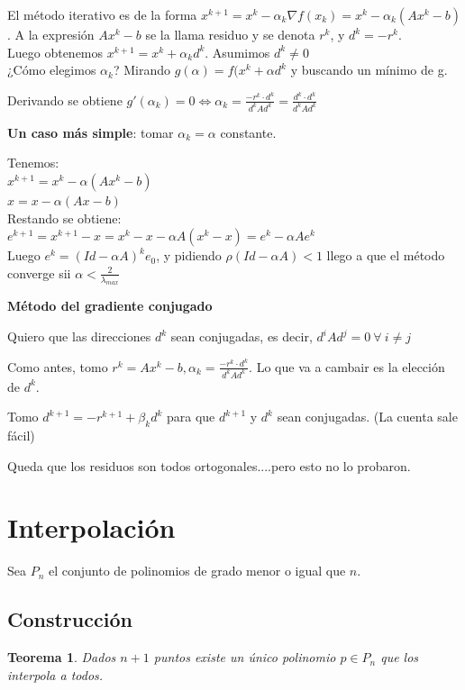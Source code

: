 \documentclass[10pt,a4paper,final]{report}
\newtheorem{theorem}{Teorema}
\begin{document}
{El método iterativo es de la forma $x^{k+1} = x^k - \alpha_k \nabla f(x_k) = x^k - \alpha_k(Ax^k-b)$. A la expresión $Ax^k-b$ se la llama residuo y se denota $r^k$, y $d^k = -r^k$. \\

Luego obtenemos $x^{k+1} = x^k + \alpha_k d^k$. Asumimos $d^k\neq0$\\

¿Cómo elegimos $\alpha_k$? Mirando $g(\alpha)=f(x^k + \alpha d^k$ y buscando un mínimo de g.

Derivando se obtiene $g'(\alpha_k) = 0 \Leftrightarrow \alpha_k = \frac{-r^k \cdot d^k}{d^k A d^k} = \frac{d^k \cdot d^k}{d^k A d^k}$

\textbf{Un caso más simple}: tomar $\alpha_k = \alpha$ constante.

Tenemos:\\

$x^{k+1}=x^k - \alpha(Ax^k-b)$\\
$x=x - \alpha(Ax-b)$\\

Restando se obtiene:\\

$e^{k+1} = x^{k+1} - x = x^k - x - \alpha A (x^k-x) = e^k - \alpha A e^k$ \\

Luego $e^k = (Id - \alpha A)^k e_0$, y pidiendo $\rho(Id-\alpha A)<1$ llego a que el método converge sii $\alpha < \frac{2}{\lambda_{max}}$


\textbf{Método del gradiente conjugado}

Quiero que las direcciones $d^k$ sean conjugadas, es decir, $d^i A d^j = 0\ \forall\ i\neq j$

Como antes, tomo $r^k = A x^k-b, \alpha_k = \frac{-r^k \cdot d^k}{d^k A d^k}$. Lo que va a cambair es la elección de $d^k$.

Tomo $d^{k+1} = - r^{k+1} + \beta_k d^k$ para que $d^{k+1}$ y $d^k$ sean conjugadas. (La cuenta sale fácil)

Queda que los residuos son todos ortogonales....pero esto no lo probaron.


\section{Interpolación}

Sea $P_n$ el conjunto de polinomios de grado menor o igual que $n$.

\subsection{Construcción}
\begin{theorem}Dados $n+1$ puntos existe un único polinomio $p\in P_n$ que los interpola a todos.
\end{theorem}

}
\end{document}
